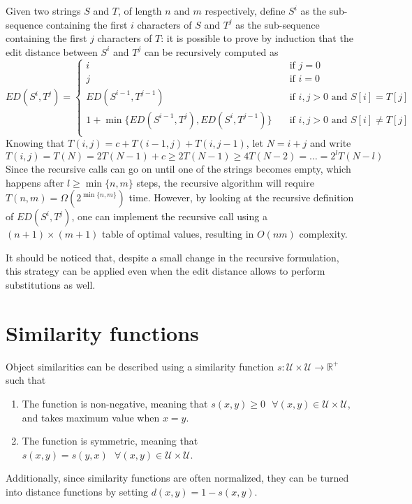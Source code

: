 \documentclass{report}
\begin{document}
\begin{proofbox}
    Given two strings $\displaystyle S$ and $\displaystyle T$, of length $\displaystyle n$ and $\displaystyle m$ respectively, define $\displaystyle S^i$ as the sub-sequence containing the first $\displaystyle i$ characters of $\displaystyle S$ and $\displaystyle T^j$ as the sub-sequence containing the first $\displaystyle j$ characters of $\displaystyle T$: it is possible to prove by induction that the edit distance between $\displaystyle S^i$ and $\displaystyle T^j$ can be recursively computed as
    \[ED(S^i, T^j) = \begin{cases}
        i &\quad\text{if $j = 0$} \\
        j &\quad\text{if $i = 0$} \\
        ED(S^{i - 1}, T^{j - 1}) &\quad\text{if $i, j > 0$ and $S[i] = T[j]$} \\
        1 + \min\{ED(S^{i - 1}, T^j), ED(S^i, T^{j - 1})\} &\quad\text{if $i, j > 0$ and $S[i] \neq T[j]$} \\
    \end{cases}\]
    Knowing that $\displaystyle T(i, j) = c + T(i - 1, j) + T(i, j - 1)$, let $\displaystyle N = i + j$ and write
    \[T(i, j) = T(N) = 2T(N - 1) + c \ge 2T(N - 1) \ge 4T(N - 2) = \dots = 2^lT(N - l)\]
    Since the recursive calls can go on until one of the strings becomes empty, which happens after $\displaystyle l \ge \min\{n, m\}$ steps, the recursive algorithm will require $\displaystyle T(n, m) = \Omega(2^{\min\{n, m\}})$ time. \newline
    However, by looking at the recursive definition of $\displaystyle ED(S^i, T^j)$, one can implement the recursive call using a $\displaystyle (n + 1) \times (m + 1)$ table of optimal values, resulting in $\displaystyle O(nm)$ complexity.
\end{proofbox}
\noindent It should be noticed that, despite a small change in the recursive formulation, this strategy can be applied even when the edit distance allows to perform substitutions as well.
\section{Similarity functions}
Object similarities can be described using a similarity function $\displaystyle s: \mathcal{U} \times \mathcal{U} \to \mathbb{R}^+$ such that
\begin{enumerate}
    \item The function is non-negative, meaning that $\displaystyle s(x, y) \ge 0 \text{ } \forall (x, y) \in \mathcal{U} \times \mathcal{U}$, and takes maximum value when $\displaystyle x = y$.
    \item The function is symmetric, meaning that $\displaystyle s(x, y) = s(y, x) \text{ } \forall (x, y) \in \mathcal{U} \times \mathcal{U}$.
\end{enumerate}
Additionally, since similarity functions are often normalized, they can be turned into distance functions by setting $\displaystyle d(x, y) = 1 - s(x, y)$.
\end{document}
